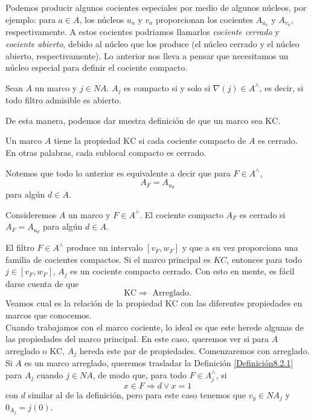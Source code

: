 Podemos producir algunos cocientes especiales por medio de algunos núcleos, por ejemplo: para $a\in A$, los núcleos $u_a$ y $v_a$ proporcionan los cocientes $A_{u_a}$ y $A_{v_a}$, respectivamente. A estos cocientes podriamos llamarlos \emph{cociente cerrado} y \emph{cociente abierto}, debido al núcleo que los produce (el núcleo cerrado y el núcleo abierto, respectivamente). 
Lo anterior nos lleva a pensar que necesitamos un núcleo especial para definir el cociente compacto. 

\begin{prop}\label{cocientecompacto}
Sean $A$ un marco y $j\in NA$. $A_j$ es compacto si y solo si $\nabla(j)\in A^\wedge$, es decir, si todo filtro admisible es abierto.
\end{prop}

De esta manera, podemos dar nuestra definición de que un marco sea $\mathrm{KC}$.

\begin{dfn}\label{KOMPACT}
	Un marco $A$ tiene la propiedad $\mathrm{KC}$ si cada cociente compacto de $A$ es cerrado. En otras palabras, cada sublocal compacto es cerrado.
\end{dfn}

Notemos que todo lo anterior es equivalente a decir que para $F\in A^\wedge$,
\[
A_F=A_{u_d}
\]
para algún $d\in A$.

\begin{dfn}\label{ccquotien}
    Consideremos $A$ un marco y $F\in A^\wedge$. El cociente compacto $A_F$ es cerrado si $A_F=A_{u_d}$ para algún $d\in A$.
\end{dfn}

El filtro $F\in A^\wedge$ produce un intervalo $[v_F, w_F]$ y que a su vez proporciona una familia de cocientes compactos. Si el marco principal es $KC$, entonces para todo $j\in [v_F, w_F]$, $A_j$ es un cociente compacto cerrado. Con esto en mente, es fácil darse cuenta de que 
\[
\mathrm{KC} \Rightarrow \mbox{ Arreglado}.
\]
Veamos cual es la relación de la propiedad $\mathrm{KC}$ con las diferentes propiedades en marcos que conocemos.\\

Cuando trabajamos con el marco cociente, lo ideal es que este herede algunas de las propiedades del marco principal. En este caso, queremos ver si para $A$ arreglado o $\mathrm{KC}$, $A_j$ hereda este par de 
propiedades. Comenzaremos con arreglado.\\

Si $A$ es un marco arreglado, queremos trasladar la Definición \ref{Definición8.2.1} para $A_j$ cuando $j\in NA$, de modo que, para todo $F\in A_j^\wedge$, si
\[
x\in F \Rightarrow d\vee x=1
\]
con $d$ similar al de la definición, pero para este caso tenemos que $v_y\in NA_j$ y $0_{A_j}=j(0)$.

